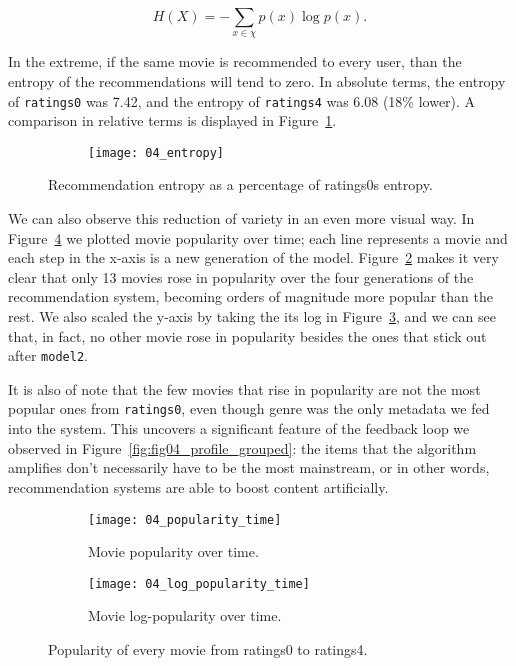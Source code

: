 $$
H(X) = - \sum_{x \in \chi} p(x) \log p(x).
$$

In the extreme, if the same movie is recommended to every user, than the entropy
of the recommendations will tend to zero. In absolute terms, the entropy of
\verb|ratings0| was 7.42, and the entropy of \verb|ratings4| was 6.08 (18\%
lower). A comparison in relative terms is displayed in
Figure~\ref{fig:fig04_entropy}.

\begin{figure}
  \centering
  \begin{subfigure}{0.45\textwidth}
    \centering
    \texttt{[image: 04\_entropy]}
  \end{subfigure}
  \caption{Recommendation entropy as a percentage of ratings0s entropy.
  \label{fig:fig04_entropy}}
\end{figure}

We can also observe this reduction of variety in an even more visual way. In
Figure~\ref{fig:fig04_popularity_time_both} we plotted movie popularity over
time; each line represents a movie and each step in the x-axis is a new
generation of the model. Figure~\ref{fig:fig04_popularity_time} makes it very
clear that only 13 movies rose in popularity over the four generations of the
recommendation system, becoming orders of magnitude more popular than the rest.
We also scaled the y-axis by taking the its log in
Figure~\ref{fig:fig04_log_popularity_time}, and we can see that, in fact, no
other movie rose in popularity besides the ones that stick out after
\verb|model2|.

It is also of note that the few movies that rise in popularity are not the most
popular ones from \verb|ratings0|, even though genre was the only metadata we
fed into the system. This uncovers a significant feature of the feedback loop we
observed in Figure~\ref{fig:fig04_profile_grouped}: the items that the algorithm
amplifies don't necessarily have to be the most mainstream, or in other words,
recommendation systems are able to boost content artificially.

\begin{figure}
  \centering
  \begin{subfigure}{0.45\textwidth}
    \centering
    \texttt{[image: 04\_popularity\_time]}
    \caption{Movie popularity over time.\label{fig:fig04_popularity_time}}
  \end{subfigure}
  \begin{subfigure}{0.45\textwidth}
    \centering
    \texttt{[image: 04\_log\_popularity\_time]}
    \caption{Movie log-popularity over time.\label{fig:fig04_log_popularity_time}}
  \end{subfigure}
  \caption{Popularity of every movie from ratings0 to ratings4.\label{fig:fig04_popularity_time_both}}
\end{figure}

